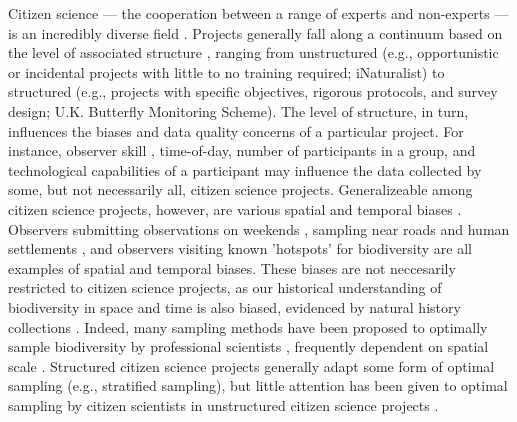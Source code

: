 \documentclass[9pt,twocolumn,twoside,lineno]{pnas-new}
\begin{document}
Citizen science --- the cooperation between a range of experts and non-experts  --- is an incredibly diverse field \cite{jordan2015citizen}. Projects generally fall along a continuum based on the level of associated structure \cite{kelling2019using, welvaert2016citizen}, ranging from unstructured (e.g., opportunistic or incidental projects with little to no training required; iNaturalist) to structured (e.g., projects with specific objectives, rigorous protocols, and survey design; U.K. Butterfly Monitoring Scheme). The level of structure, in turn, influences the biases and data quality concerns of a particular project. For instance, observer skill \cite{kelling2015can}, time-of-day, number of participants in a group, and technological capabilities of a participant may influence the data collected by some, but not necessarily all, citizen science projects. Generalizeable among citizen science projects, however, are various spatial and temporal biases \cite{boakes2010distorted, bird2014statistical}. Observers submitting observations on weekends \cite{courter2013weekend}, sampling near roads and human settlements \cite{kelling2015taking}, and observers visiting known 'hotspots' for biodiversity \cite{geldmann2016determines} are all examples of spatial and temporal biases. These biases are not neccesarily restricted to citizen science projects, as our historical understanding of biodiversity in space and time is also biased, evidenced by natural history collections \cite{pyke2010biological, boakes2010distorted}. Indeed, many sampling methods have been proposed to optimally sample biodiversity by professional scientists \cite{etienne2005new, moreno2000assessing, colwell1994estimating, longino1997biodiversity, ferrarini2012biodiversity}, frequently dependent on spatial scale \cite{chase2013scale}. Structured citizen science projects generally adapt some form of optimal sampling (e.g., stratified sampling), but little attention has been given to optimal sampling by citizen scientists in unstructured citizen science projects \cite{harrison2014assessing}.
\end{document}
